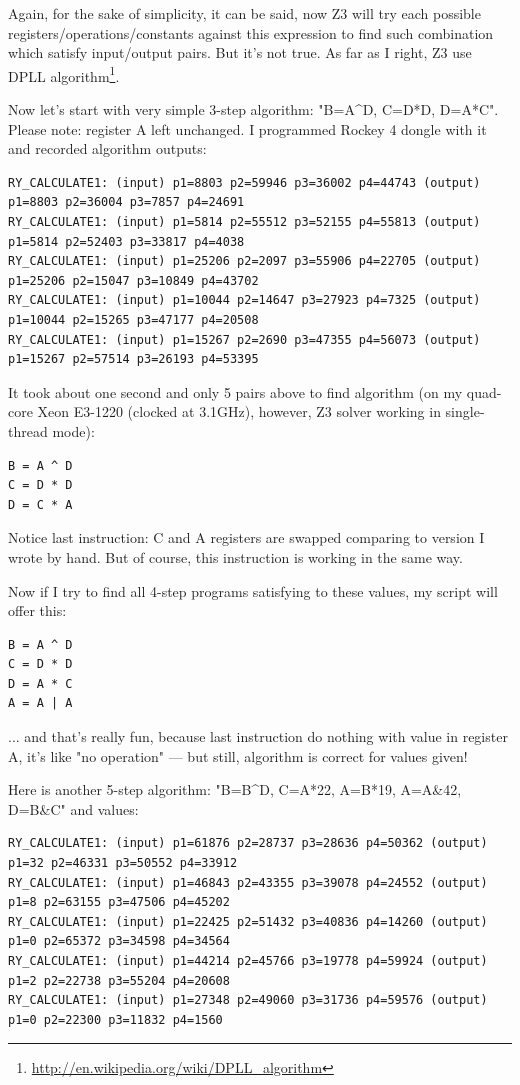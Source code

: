 Again, for the sake of simplicity, it can be said, now Z3 will try each possible registers/operations/constants against this expression to find such combination which satisfy input/output pairs. 
But it's not true. 
As far as I right, Z3 use DPLL algorithm\footnote{\url{http://en.wikipedia.org/wiki/DPLL_algorithm}}.

Now let's start with very simple 3-step algorithm: "B=A\^{}D, C=D*D, D=A*C". Please note: register A left unchanged.
I programmed Rockey 4 dongle with it and recorded algorithm outputs:

\begin{lstlisting}
RY_CALCULATE1: (input) p1=8803 p2=59946 p3=36002 p4=44743 (output) p1=8803 p2=36004 p3=7857 p4=24691
RY_CALCULATE1: (input) p1=5814 p2=55512 p3=52155 p4=55813 (output) p1=5814 p2=52403 p3=33817 p4=4038
RY_CALCULATE1: (input) p1=25206 p2=2097 p3=55906 p4=22705 (output) p1=25206 p2=15047 p3=10849 p4=43702
RY_CALCULATE1: (input) p1=10044 p2=14647 p3=27923 p4=7325 (output) p1=10044 p2=15265 p3=47177 p4=20508
RY_CALCULATE1: (input) p1=15267 p2=2690 p3=47355 p4=56073 (output) p1=15267 p2=57514 p3=26193 p4=53395
\end{lstlisting}

It took about one second and only 5 pairs above to find algorithm (on my quad-core Xeon E3-1220 (clocked at 3.1GHz), 
however, Z3 solver working in single-thread mode):

\begin{lstlisting}
B = A ^ D
C = D * D
D = C * A
\end{lstlisting}

Notice last instruction: C and A registers are swapped comparing to version I wrote by hand. 
But of course, this instruction is working in the same way.

Now if I try to find all 4-step programs satisfying to these values, my script will offer this:

\begin{lstlisting}
B = A ^ D
C = D * D
D = A * C
A = A | A
\end{lstlisting}

... and that's really fun, because last instruction do nothing with value in register A, it's like "no operation" 
--- but still, algorithm is correct for values given!

Here is another 5-step algorithm: "B=B\^{}D, C=A*22, A=B*19, A=A\&42, D=B\&C" and values:

\begin{lstlisting}
RY_CALCULATE1: (input) p1=61876 p2=28737 p3=28636 p4=50362 (output) p1=32 p2=46331 p3=50552 p4=33912
RY_CALCULATE1: (input) p1=46843 p2=43355 p3=39078 p4=24552 (output) p1=8 p2=63155 p3=47506 p4=45202
RY_CALCULATE1: (input) p1=22425 p2=51432 p3=40836 p4=14260 (output) p1=0 p2=65372 p3=34598 p4=34564
RY_CALCULATE1: (input) p1=44214 p2=45766 p3=19778 p4=59924 (output) p1=2 p2=22738 p3=55204 p4=20608
RY_CALCULATE1: (input) p1=27348 p2=49060 p3=31736 p4=59576 (output) p1=0 p2=22300 p3=11832 p4=1560
\end{lstlisting}

